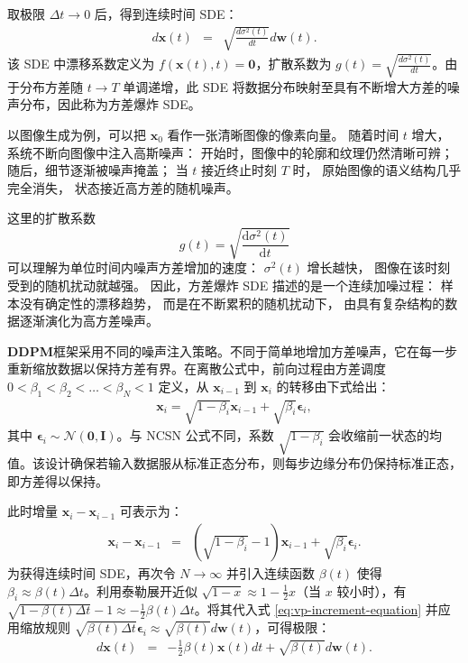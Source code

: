 取极限 $\Delta t \to 0$ 后，得到连续时间 SDE：
\begin{eqnarray}
d\mathbf{x}(t) & = & \sqrt{\frac{d\sigma^2(t)}{dt}} d\mathbf{w}(t).
\label{eq:ve-sde}
\end{eqnarray}
该 SDE 中漂移系数定义为 $f(\mathbf{x}(t), t) = \mathbf{0}$，扩散系数为 $g(t) = \sqrt{\frac{d\sigma^2(t)}{dt}}$。由于分布方差随 $t \to T$ 单调递增，此 SDE 将数据分布映射至具有不断增大方差的噪声分布，因此称为方差爆炸 SDE。

以图像生成为例，可以把
\(\mathbf{x}_0\)
看作一张清晰图像的像素向量。
随着时间 \(t\) 增大，系统不断向图像中注入高斯噪声：
开始时，图像中的轮廓和纹理仍然清晰可辨；
随后，细节逐渐被噪声掩盖；
当 \(t\) 接近终止时刻 \(T\) 时，
原始图像的语义结构几乎完全消失，
状态接近高方差的随机噪声。

这里的扩散系数
\[
    g(t)
    =
    \sqrt{
        \frac{\mathrm{d}\sigma^2(t)}
        {\mathrm{d}t}
    }
\]
可以理解为单位时间内噪声方差增加的速度：
\(\sigma^2(t)\) 增长越快，
图像在该时刻受到的随机扰动就越强。
因此，方差爆炸 SDE 描述的是一个连续加噪过程：
样本没有确定性的漂移趋势，
而是在不断累积的随机扰动下，
由具有复杂结构的数据逐渐演化为高方差噪声。

\textbf{DDPM}框架采用不同的噪声注入策略。不同于简单地增加方差噪声，它在每一步重新缩放数据以保持方差有界。在离散公式中，前向过程由方差调度 $0 < \beta_1 < \beta_2 < \dots < \beta_N < 1$ 定义，从 $\mathbf{x}_{i-1}$ 到 $\mathbf{x}_i$ 的转移由下式给出：
\begin{eqnarray}
\mathbf{x}_i = \sqrt{1 - \beta_i} \mathbf{x}_{i-1} + \sqrt{\beta_i} \boldsymbol{\epsilon}_i,
\end{eqnarray}
其中 $\boldsymbol{\epsilon}_i \sim \mathcal{N}(\mathbf{0}, \mathbf{I})$。与 NCSN 公式不同，系数 $\sqrt{1 - \beta_i}$ 会收缩前一状态的均值。该设计确保若输入数据服从标准正态分布，则每步边缘分布仍保持标准正态，即方差得以保持。

此时增量 $\mathbf{x}_i - \mathbf{x}_{i-1}$ 可表示为：
\begin{eqnarray}
\mathbf{x}_i - \mathbf{x}_{i-1} & = & (\sqrt{1 - \beta_i} - 1) \mathbf{x}_{i-1} + \sqrt{\beta_i} \boldsymbol{\epsilon}_i.
\label{eq:vp-increment-equation}
\end{eqnarray}
为获得连续时间 SDE，再次令 $N \to \infty$ 并引入连续函数 $\beta(t)$ 使得 $\beta_i \approx \beta(t) \Delta t$。利用泰勒展开近似 $\sqrt{1 - x} \approx 1 - \frac{1}{2}x$（当 $x$ 较小时），有 $\sqrt{1 - \beta(t) \Delta t} - 1 \approx -\frac{1}{2}\beta(t) \Delta t$。将其代入式 \eqref{eq:vp-increment-equation} 并应用缩放规则 $\sqrt{\beta(t) \Delta t} \boldsymbol{\epsilon}_i \approx \sqrt{\beta(t)} d\mathbf{w}(t)$，可得极限：
\begin{eqnarray}
d\mathbf{x}(t) & = & -\frac{1}{2} \beta(t) \mathbf{x}(t) d t + \sqrt{\beta(t)} d\mathbf{w}(t).
\label{eq:vp-sde}
\end{eqnarray}

